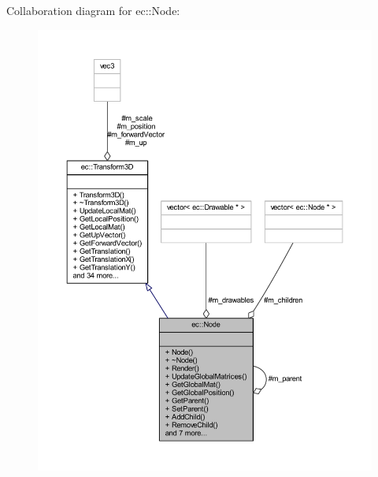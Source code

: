 Collaboration diagram for ec\+:\+:Node\+:
\nopagebreak
\begin{figure}[H]
\begin{center}
\leavevmode
\includegraphics[width=350pt]{classec_1_1_node__coll__graph}
\end{center}
\end{figure}
